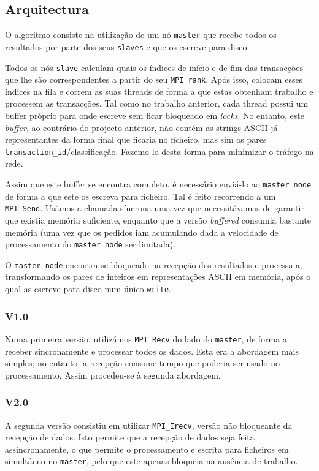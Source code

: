 \documentclass[a4paper]{article}
\begin{document}
\subsection{Arquitectura}
O algoritmo consiste na utilização de um nó \texttt{master} que recebe todos os resultados por parte dos seus \texttt{slaves} e que os escreve para disco.

Todos os nós \texttt{slave} calculam quais os índices de início e de fim das transacções que lhe são correspondentes a partir do seu \texttt{MPI rank}. Após isso, colocam esses índices na fila e correm as suas threads de forma a que estas obtenham trabalho e processem as transacções. Tal como no trabalho anterior, cada thread possui um buffer próprio para onde escreve sem ficar bloqueado em \textit{locks}. No entanto, este \textit{buffer}, ao contrário do projecto anterior, não contém as strings ASCII já representantes da forma final que ficaria no ficheiro, mas sim os pares \texttt{transaction\_id}/classificação. Fazemo-lo desta forma para minimizar o tráfego na rede.

Assim que este buffer se encontra completo, é necessário enviá-lo ao \texttt{master node} de forma a que este os escreva para ficheiro. Tal é feito recorrendo a um \texttt{MPI\_Send}. Usámos a chamada síncrona uma vez que necessitávamos de garantir que existia memória suficiente, enquanto que a versão \textit{buffered} consumia bastante memória (uma vez que os pedidos iam acumulando dada a velocidade de processamento do \texttt{master node} ser limitada).

O \texttt{master node} encontra-se bloqueado na recepção dos resultados e processa-a, transformando os pares de inteiros em representações ASCII em memória, após o qual as escreve para disco num único \texttt{write}.

\subsubsection{V1.0}
\indent \indent Numa primeira versão, utilizámos \texttt{MPI\_Recv} do lado do \texttt{master}, de forma a receber sincronamente e processar todos os dados. Esta era a abordagem mais simples; no entanto, a recepção consome tempo que poderia ser usado no processamento. Assim procedeu-se à segunda abordagem.

\subsubsection{V2.0}
\indent \indent A segunda versão consistiu em utilizar \texttt{MPI\_Irecv}, versão não bloqueante da recepção de dados. Isto permite que a recepção de dados seja feita assincronamente, o que permite o processamento e escrita para ficheiros em simultâneo no \texttt{master}, pelo que este apenas bloqueia na ausência de trabalho.
\end{document}
